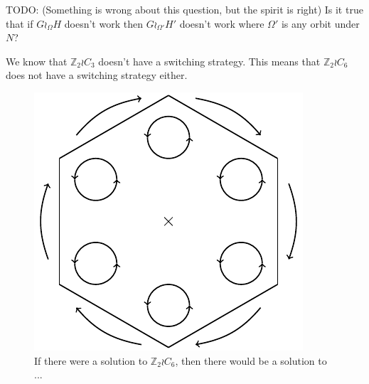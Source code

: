 TODO: (Something is wrong about this question, but the spirit is right)
Is it true that if $G \wr_\Omega H$ doesn't work then $G \wr_{\Omega'} H'$
doesn't work where $\Omega'$ is any orbit under $N$?
\begin{example}
  We know that $\mathbb Z_2 \wr C_3$ doesn't have a switching strategy.
  This means that $\mathbb Z_2 \wr C_6$ does not have a switching strategy either.
  \begin{figure}
    \includegraphics{assets/tikz_Z2C6.pdf}
    \caption{If there were a solution to $\mathbb Z_2 \wr C_6$, then there
    would be a solution to ...}
  \end{figure}
\end{example}

%
%
